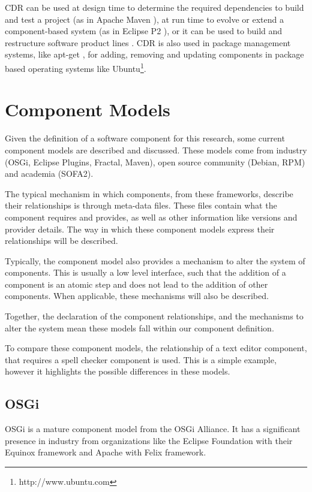 CDR can be used at design time to determine the required dependencies to build and test a project (as in Apache Maven \cite{casey_better_2008}),
at run time to evolve or extend a component-based system (as in Eclipse P2 \cite{leBerre2010}),
or it can be used to build and restructure software product lines \cite{savolainen_analyzing_2007}.
CDR is also used in package management systems, like apt-get \cite{Barth2005},
for adding, removing and updating components in package based operating systems like Ubuntu\footnote{http://www.ubuntu.com}. 



\section{Component Models}
\label{background.models}
Given the definition of a software component for this research, some current component models are described and discussed.
These models come from industry (OSGi, Eclipse Plugins, Fractal, Maven), open source community (Debian, RPM) and academia (SOFA2).

The typical mechanism in which components, from these frameworks, describe their relationships is through meta-data files.
These files contain what the component requires and provides, as well as other information like versions and provider details.
The way in which these component models express their relationships will be described.

Typically, the component model also provides a mechanism to alter the system of components.
This is usually a low level interface, such that the addition of a component is an atomic step and does not lead to the addition of other components.
When applicable, these mechanisms will also be described.

Together, the declaration of the component relationships, and the mechanisms to alter the system mean these models fall within our component definition.

To compare these component models, the relationship of a text editor component, that requires a spell checker component is used.
This is a simple example, however it highlights the possible differences in these models.


\subsection{OSGi}
OSGi is a mature component model from the OSGi Alliance.
It has a significant presence in industry \cite{Kriens2008} from organizations like the Eclipse Foundation with their Equinox framework and Apache with Felix framework.

